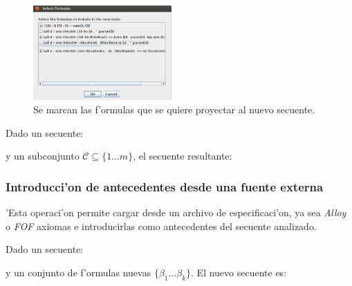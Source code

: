\begin{figure}[H]
	\includegraphics[width=200px]{img/select.png}
	\centering
	\caption{Se marcan las f'ormulas que se quiere proyectar al nuevo secuente.}
\end{figure}

Dado un secuente:

\begin{prooftree}
\end{prooftree}

y un subconjunto $\mathcal{C} \subseteq \{1 \ldots m\}$, el secuente resultante:

\begin{prooftree}
\end{prooftree}

\vspace{1em}
\subsubsection{Introducci'on de antecedentes desde una fuente externa}

'Esta operaci'on permite cargar desde un archivo de especificaci'on, ya sea \textit{Alloy} o \textit{FOF} axiomas e introducirlas como antecedentes del secuente analizado.

Dado un secuente:

\begin{prooftree}
\end{prooftree}

y un conjunto de f'ormulas nuevas $\{\beta_1 \ldots \beta_k\}$. El nuevo secuente es:

\begin{prooftree}
\end{prooftree}


